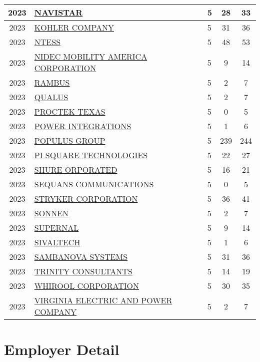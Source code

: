 \documentclass{article}%
\begin{document}
\begin{longtable}{c|p{20em}|p{5em}|c|c}
\hline%
2023&\hyperref[subsec:NAVISTAR]{NAVISTAR}&5&28&33\\%
\hline%
2023&\hyperref[subsec:KOHLERCOMPANY]{KOHLER COMPANY}&5&31&36\\%
\hline%
2023&\hyperref[subsec:NTESS]{NTESS}&5&48&53\\%
\hline%
2023&\hyperref[subsec:NIDECMOBILITYAMERICACORPORATION]{NIDEC MOBILITY AMERICA CORPORATION}&5&9&14\\%
\hline%
2023&\hyperref[subsec:RAMBUS]{RAMBUS}&5&2&7\\%
\hline%
2023&\hyperref[subsec:QUALUS]{QUALUS}&5&2&7\\%
\hline%
2023&\hyperref[subsec:PROCTEKTEXAS]{PROCTEK TEXAS}&5&0&5\\%
\hline%
2023&\hyperref[subsec:POWERINTEGRATIONS]{POWER INTEGRATIONS}&5&1&6\\%
\hline%
2023&\hyperref[subsec:POPULUSGROUP]{POPULUS GROUP}&5&239&244\\%
\hline%
2023&\hyperref[subsec:PISQUARETECHNOLOGIES]{PI SQUARE TECHNOLOGIES}&5&22&27\\%
\hline%
2023&\hyperref[subsec:SHUREORPORATED]{SHURE ORPORATED}&5&16&21\\%
\hline%
2023&\hyperref[subsec:SEQUANSCOMMUNICATIONS]{SEQUANS COMMUNICATIONS}&5&0&5\\%
\hline%
2023&\hyperref[subsec:STRYKERCORPORATION]{STRYKER CORPORATION}&5&36&41\\%
\hline%
2023&\hyperref[subsec:SONNEN]{SONNEN}&5&2&7\\%
\hline%
2023&\hyperref[subsec:SUPERNAL]{SUPERNAL}&5&9&14\\%
\hline%
2023&\hyperref[subsec:SIVALTECH]{SIVALTECH}&5&1&6\\%
\hline%
2023&\hyperref[subsec:SAMBANOVASYSTEMS]{SAMBANOVA SYSTEMS}&5&31&36\\%
\hline%
2023&\hyperref[subsec:TRINITYCONSULTANTS]{TRINITY CONSULTANTS}&5&14&19\\%
\hline%
2023&\hyperref[subsec:WHIROOLCORPORATION]{WHIROOL CORPORATION}&5&30&35\\%
\hline%
2023&\hyperref[subsec:VIRGINIAELECTRICANDPOWERCOMPANY]{VIRGINIA ELECTRIC AND POWER COMPANY}&5&2&7\\%
\hline%
\end{longtable}

%
\newpage

%
\section{Employer Detail}%
\label{sec:EmployerDetail}%
\end{document}
